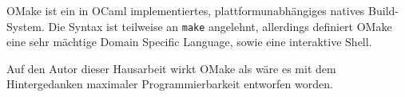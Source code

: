 OMake  ist ein in OCaml implementiertes,
plattformunabhängiges natives Build-System. Die Syntax ist teilweise an
\texttt{make} angelehnt, allerdings definiert OMake eine sehr mächtige Domain
Specific Language, sowie eine interaktive Shell.
%

Auf den Autor dieser Hausarbeit wirkt OMake als wäre es mit dem Hintergedanken
maximaler Programmierbarkeit entworfen worden.
